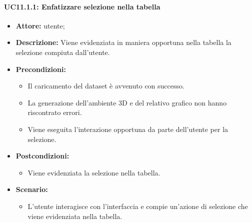 \paragraph{UC11.1.1: Enfatizzare selezione nella tabella}
\begin{itemize}    
    \item \textbf{Attore:} utente;
    \item \textbf{Descrizione:} Viene evidenziata in maniera opportuna nella tabella la selezione compiuta dall'utente.
    \item \textbf{Precondizioni:}    
        \begin{itemize}
            \item Il caricamento del dataset è avvenuto con successo.
            \item La generazione dell'ambiente 3D e del relativo grafico non hanno riscontrato errori.
            \item Viene eseguita l'interazione opportuna da parte dell'utente per la selezione.
        \end{itemize}    
    \item \textbf{Postcondizioni:}
        \begin{itemize}
            \item Viene evidenziata la selezione nella tabella.
        \end{itemize}    
    \item \textbf{Scenario:} 
        \begin{itemize}
            \item L'utente interagisce con l'interfaccia e compie un'azione di selezione che viene evidenziata nella tabella.
        \end{itemize}
\end{itemize}